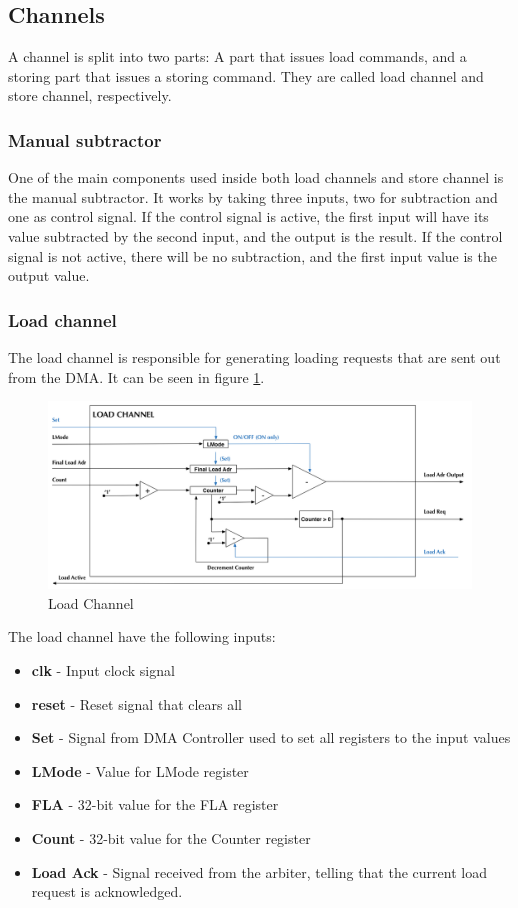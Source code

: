 \subsection{Channels}
A channel is split into two parts: A part that issues load commands, and a storing part that issues a storing command. 
They are called load channel and store channel, respectively.

\subsubsection{Manual subtractor}
One of the main components used inside both load channels and store channel is the manual subtractor.
It works by taking three inputs, two for subtraction and one as control signal.
If the control signal is active, the first input will have its value subtracted by the second input, and the output is the result.
If the control signal is not active, there will be no subtraction, and the first input value is the output value. 

\subsubsection{Load channel}
The load channel is responsible for generating loading requests that are sent out from the DMA.
It can be seen in figure \ref{fig:loadChannel}.

\begin{figure}[h!]
    \centering
    \includegraphics[width=1.0\textwidth]{Figures/DMA/LoadChannel}
    \caption{Load Channel}
    \label{fig:loadChannel}
\end{figure}

The load channel have the following inputs:

\begin{itemize}
    \item \textbf{clk} - Input clock signal
    \item \textbf{reset} - Reset signal that clears all 
    \item \textbf{Set} - Signal from DMA Controller used to set all registers to the input values
    \item \textbf{LMode} - Value for LMode register
    \item \textbf{FLA} - 32-bit value for the FLA register
    \item \textbf{Count} - 32-bit value for the Counter register
    \item \textbf{Load Ack} - Signal received from the arbiter, telling that the current load request is acknowledged.
\end{itemize}

